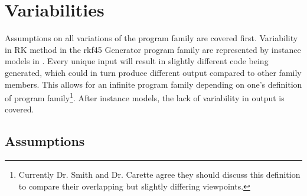 \documentclass[12pt]{article}
\newcommand{\famname}{rkf45 Generator} %
\begin{document}

\section{Variabilities}

Assumptions on all variations of the program family are covered first.
Variability in RK method in the \famname{} program family are represented by
instance models in . Every unique input will result in
slightly different code being generated, which could in turn produce different
output compared to other family members. This allows for an infinite program
family depending on one's definition of program family\footnote{Currently
  Dr. Smith and Dr. Carette agree they should discuss this definition to compare
  their overlapping but slightly differing viewpoints. }. After instance models, the lack of
variability in output is covered.

\subsection{Assumptions}\label{ssec:Assumptions}
\end{document}
